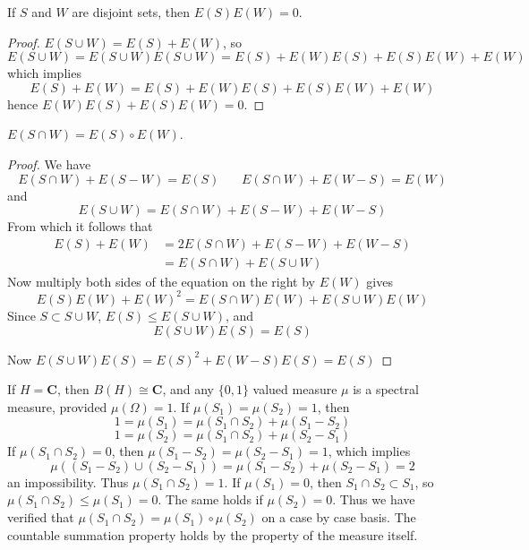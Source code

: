 \begin{lemma}
    If $S$ and $W$ are disjoint sets, then $E(S)E(W) = 0$.
\end{lemma}
\begin{proof}
    $E(S \cup W) = E(S) + E(W)$, so
    \[ E(S \cup W) = E(S \cup W) E(S \cup W) = E(S) + E(W) E(S) + E(S)E(W) + E(W) \]
    which implies
    \[ E(S) + E(W) = E(S) + E(W) E(S) + E(S) E(W) + E(W) \]
    hence $E(W) E(S) + E(S) E(W) = 0$.
\end{proof}

\begin{lemma}
    $E(S \cap W) = E(S) \circ E(W)$.
\end{lemma}
\begin{proof}
    We have
    \[ E(S \cap W) + E(S - W) = E(S)\ \ \ \ \ \ \ \ E(S \cap W) + E(W - S) = E(W) \]
    and
    \[ E(S \cup W) = E(S \cap W) + E(S - W) + E(W - S) \]
    From which it follows that
    \begin{align*}
        E(S) + E(W) &= 2E(S \cap W) + E(S - W) + E(W - S)\\
        &= E(S \cap W) + E(S \cup W)
    \end{align*}
    Now multiply both sides of the equation on the right by $E(W)$ gives
    \[ E(S) E(W) + E(W)^2 = E(S \cap W) E(W) + E(S \cup W) E(W) \]
    Since $S \subset S \cup W$, $E(S) \leq E(S \cup W)$, and
    \[ E(S \cup W) E(S) = E(S) \]

    Now $E(S \cup W) E(S) = E(S)^2 + E(W - S) E(S) = E(S)$
\end{proof}

\begin{example}
    If $H = \mathbf{C}$, then $B(H) \cong \mathbf{C}$, and any $\{ 0, 1 \}$ valued measure $\mu$ is a spectral measure, provided $\mu(\Omega) = 1$. If $\mu(S_1) = \mu(S_2) = 1$, then
    \[ 1 = \mu(S_1) = \mu(S_1 \cap S_2) + \mu(S_1 - S_2) \]
    \[ 1 = \mu(S_2) = \mu(S_1 \cap S_2) + \mu(S_2 - S_1) \]
    If $\mu(S_1 \cap S_2) = 0$, then $\mu(S_1 - S_2) = \mu(S_2 - S_1) = 1$, which implies
    \[ \mu((S_1 - S_2) \cup (S_2 - S_1)) = \mu(S_1 - S_2) + \mu(S_2 - S_1) = 2 \]
    an impossibility. Thus $\mu(S_1 \cap S_2) = 1$. If $\mu(S_1) = 0$, then $S_1 \cap S_2 \subset S_1$, so $\mu(S_1 \cap S_2) \leq \mu(S_1) = 0$. The same holds if $\mu(S_2) = 0$. Thus we have verified that $\mu(S_1 \cap S_2) = \mu(S_1) \circ \mu(S_2)$ on a case by case basis. The countable summation property holds by the property of the measure itself.
\end{example}

